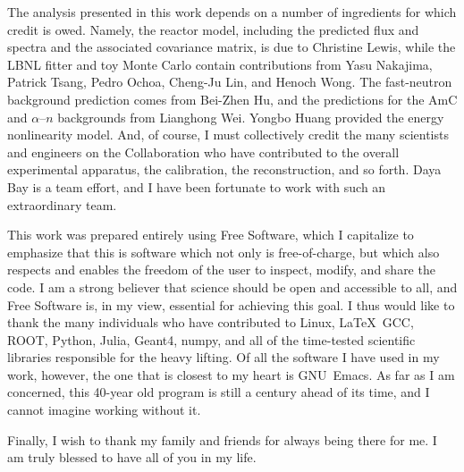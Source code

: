 \documentclass[../thesis.tex]{subfiles}
\begin{document}
The analysis presented in this work depends on a number of ingredients for which credit is owed. Namely, the reactor model, including the predicted flux and spectra and the associated covariance matrix, is due to Christine Lewis, while the LBNL fitter and toy Monte Carlo contain contributions from Yasu Nakajima, Patrick Tsang, Pedro Ochoa, Cheng-Ju Lin, and Henoch Wong. The fast-neutron background prediction comes from Bei-Zhen Hu, and the predictions for the AmC and $\alpha$--$n$ backgrounds from Lianghong Wei. Yongbo Huang provided the energy nonlinearity model. And, of course, I must collectively credit the many scientists and engineers on the Collaboration who have contributed to the overall experimental apparatus, the calibration, the reconstruction, and so forth. Daya Bay is a team effort, and I have been fortunate to work with such an extraordinary team.

This work was prepared entirely using Free Software, which I capitalize to emphasize that this is software which not only is free-of-charge, but which also respects and enables the freedom of the user to inspect, modify, and share the code. I am a strong believer that science should be open and accessible to all, and Free Software is, in my view, essential for achieving this goal. I thus would like to thank the many individuals who have contributed to Linux, \LaTeX\, GCC, ROOT, Python, Julia, Geant4, numpy, and all of the time-tested scientific libraries responsible for the heavy lifting. Of all the software I have used in my work, however, the one that is closest to my heart is GNU~Emacs. As far as I am concerned, this 40-year old program is still a century ahead of its time, and I cannot imagine working without it.

Finally, I wish to thank my family and friends for always being there for me. I am truly blessed to have all of you in my life.
\end{document}
